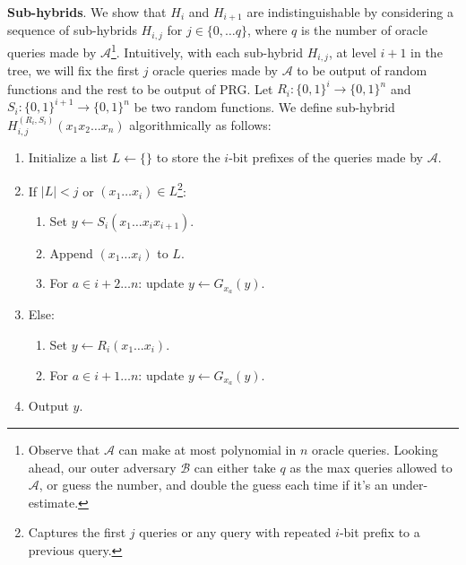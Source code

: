 \documentclass[12pt]{tufte-book}
\begin{document}
\noindent \textbf{Sub-hybrids}. We show that $H_{i}$ and $H_{i+1}$ are indistinguishable by considering a sequence of sub-hybrids $H_{i,j}$ for $j \in \{0,\ldots q\}$, where $q$ is the number of oracle queries made by $\mathcal{A}$\footnote{Observe that $\mathcal{A}$ can make at most polynomial in $n$ oracle queries. Looking ahead, our outer adversary $\mathcal{B}$ can either take $q$ as the max queries allowed to $\mathcal{A}$, or guess the number, and double the guess each time if it's an under-estimate.}.
Intuitively, with each sub-hybrid $H_{i,j}$, at level $i+1$ in the tree, we will fix the first $j$ oracle queries made by $\mathcal{A}$ to be output of random functions and the rest to be output of PRG. Let $R_i: \{0, 1\}^i \to \{0, 1\}^n$ and $S_{i}: \{0, 1\}^{i+1} \to \{0, 1\}^n$ be two random functions.
We define sub-hybrid $H_{i,j}^{(R_i, S_{i})}(x_1x_2\dots x_n)$ algorithmically as follows:
\begin{enumerate}
    \item Initialize a list $L \gets \{\}$ to store the $i$-bit prefixes of the queries made by $\mathcal{A}$.
    \item If $|L| < j$ or $(x_1\dots x_i) \in L$\footnote{Captures the first $j$ queries or any query with repeated $i$-bit prefix to a previous query.}:
          \begin{enumerate}
              \item Set $y \gets S_i(x_1\dots x_i x_{i+1})$.
              \item Append $(x_1\dots x_i)$ to $L$.
              \item For $a \in i+2 \dots n$: update $y \gets G_{x_a}(y)$.
          \end{enumerate}
    \item Else:
          \begin{enumerate}
              \item Set $y \gets R_i(x_1\dots x_i)$.
              \item For $a \in i+1 \dots n$: update $y \gets G_{x_a}(y)$.
          \end{enumerate}
    \item Output $y$.
\end{enumerate}
\end{document}
